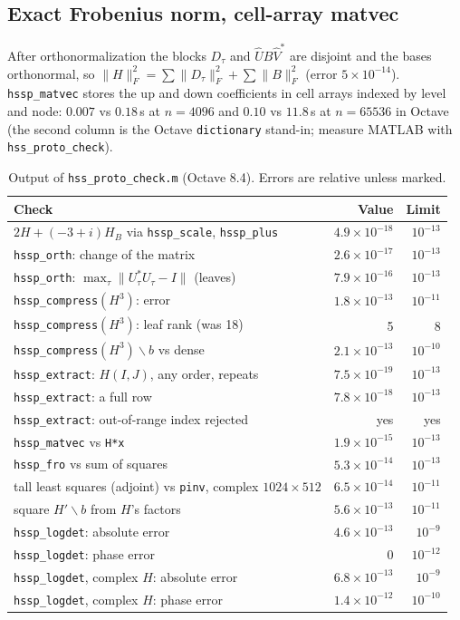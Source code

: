 \documentclass[11pt]{article}
\newcommand{\code}[1]{\texttt{#1}}
\begin{document}
\subsection{Exact Frobenius norm, cell-array matvec}
After orthonormalization the blocks $D_\tau$ and $\hat U B\hat V^*$ are disjoint and the bases orthonormal, so
$\|H\|_F^2=\sum\|D_\tau\|_F^2+\sum\|B\|_F^2$ (error $5\times10^{-14}$). \code{hssp\_matvec} stores the up and
down coefficients in cell arrays indexed by level and node: $0.007$ vs $0.18$\,s at $n=4096$ and $0.10$ vs
$11.8$\,s at $n=65536$ in Octave (the second column is the Octave \code{dictionary} stand-in; measure MATLAB with
\code{hss\_proto\_check}).

\begin{table}[h]
\centering\small
\caption{Output of \code{hss\_proto\_check.m} (Octave 8.4). Errors are relative unless marked.}\label{tab:proto}
\begin{tabularx}{\linewidth}{@{}Yrr@{}}
\toprule
Check & Value & Limit\\
\midrule
$2H+(-3+i)H_B$ via \code{hssp\_scale}, \code{hssp\_plus} & $4.9\times10^{-18}$ & $10^{-13}$\\
\code{hssp\_orth}: change of the matrix & $2.6\times10^{-17}$ & $10^{-13}$\\
\code{hssp\_orth}: $\max_\tau\|U_\tau^*U_\tau-I\|$ (leaves) & $7.9\times10^{-16}$ & $10^{-13}$\\
\code{hssp\_compress}$(H^3)$: error & $1.8\times10^{-13}$ & $10^{-11}$\\
\code{hssp\_compress}$(H^3)$: leaf rank (was 18) & 5 & 8\\
\code{hssp\_compress}$(H^3)\backslash b$ vs dense & $2.1\times10^{-13}$ & $10^{-10}$\\
\code{hssp\_extract}: $H(I,J)$, any order, repeats & $7.5\times10^{-19}$ & $10^{-13}$\\
\code{hssp\_extract}: a full row & $7.8\times10^{-18}$ & $10^{-13}$\\
\code{hssp\_extract}: out-of-range index rejected & yes & yes\\
\code{hssp\_matvec} vs \code{H*x} & $1.9\times10^{-15}$ & $10^{-13}$\\
\code{hssp\_fro} vs sum of squares & $5.3\times10^{-14}$ & $10^{-13}$\\
tall least squares (adjoint) vs \code{pinv}, complex $1024\times512$ & $6.5\times10^{-14}$ & $10^{-11}$\\
square $H'\backslash b$ from $H$'s factors & $5.6\times10^{-13}$ & $10^{-11}$\\
\code{hssp\_logdet}: absolute error & $4.6\times10^{-13}$ & $10^{-9}$\\
\code{hssp\_logdet}: phase error & 0 & $10^{-12}$\\
\code{hssp\_logdet}, complex $H$: absolute error & $6.8\times10^{-13}$ & $10^{-9}$\\
\code{hssp\_logdet}, complex $H$: phase error & $1.4\times10^{-12}$ & $10^{-10}$\\
\bottomrule
\end{tabularx}
\end{table}
\end{document}
